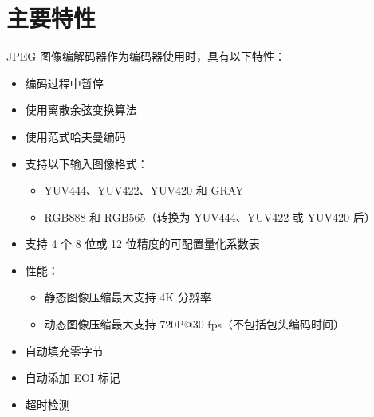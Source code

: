 \documentclass[main\_\_CN.tex]{subfiles}
\begin{document}
\section{主要特性}
\label{sec:jpegcodec-features}

JPEG 图像编解码器作为编码器使用时，具有以下特性：
\begin{itemize}
    \item 编码过程中暂停
    \item 使用离散余弦变换算法
    \item 使用范式哈夫曼编码
    \item 支持以下输入图像格式：
        \begin{itemize}
            \item YUV444、YUV422、YUV420 和 GRAY
            \item RGB888 和 RGB565（转换为 YUV444、YUV422 或 YUV420 后）
        \end{itemize}
    \item 支持 4 个 8 位或 12 位精度的可配置量化系数表
    \item 性能：
        \begin{itemize}
            \item 静态图像压缩最大支持 4K 分辨率
            \item 动态图像压缩最大支持 720P@30 fps（不包括包头编码时间）
        \end{itemize}
    \item 自动填充零字节
    \item 自动添加 EOI 标记
    \item 超时检测
\end{itemize}
\end{document}
